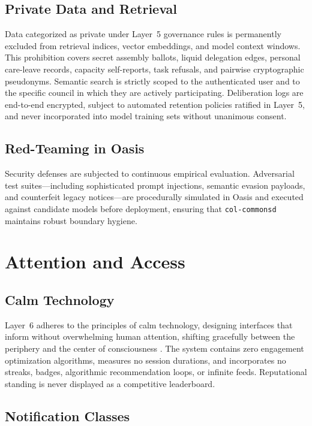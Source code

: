 \subsection{Private Data and Retrieval}

Data categorized as private under Layer~5 governance rules is permanently excluded from retrieval indices, vector embeddings, and model context windows. This prohibition covers secret assembly ballots, liquid delegation edges, personal care-leave records, capacity self-reports, task refusals, and pairwise cryptographic pseudonyms. Semantic search is strictly scoped to the authenticated user and to the specific council in which they are actively participating. Deliberation logs are end-to-end encrypted, subject to automated retention policies ratified in Layer~5, and never incorporated into model training sets without unanimous consent.

\subsection{Red-Teaming in Oasis}

Security defenses are subjected to continuous empirical evaluation. Adversarial test suites---including sophisticated prompt injections, semantic evasion payloads, and counterfeit legacy notices---are procedurally simulated in Oasis and executed against candidate models before deployment, ensuring that \texttt{col-commonsd} maintains robust boundary hygiene.

\section{Attention and Access}

\subsection{Calm Technology}

Layer~6 adheres to the principles of calm technology, designing interfaces that inform without overwhelming human attention, shifting gracefully between the periphery and the center of consciousness \parencite{weiser1996calm}. The system contains zero engagement optimization algorithms, measures no session durations, and incorporates no streaks, badges, algorithmic recommendation loops, or infinite feeds. Reputational standing is never displayed as a competitive leaderboard.

\subsection{Notification Classes}

